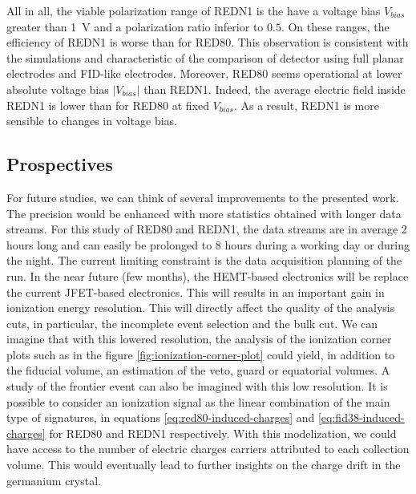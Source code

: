 All in all, the viable polarization range of REDN1 is the have a voltage bias $V_{bias}$ greater than \SI{1}{\volt} and a polarization ratio inferior to $0.5$. On these ranges, the efficiency of REDN1 is worse than for RED80. This observation is consistent with the simulations and characteristic of the comparison of detector using full planar electrodes and FID-like electrodes. Moreover, RED80 seems operational at lower absolute voltage bias $| V_{bias} |$ than REDN1. Indeed, the average electric field inside REDN1 is lower than for RED80 at fixed $V_{bias}$. As a result, REDN1 is more sensible to changes in voltage bias.


\subsection{Prospectives}

For future studies, we can think of several improvements to the presented work.
The precision would be enhanced with more statistics obtained with longer data streams. For this study of RED80 and REDN1, the data streams are in average 2 hours long and can easily be prolonged to 8 hours during a working day or during the night. The current limiting constraint is the data acquisition planning of the run.
In the near future (few months), the HEMT-based electronics will be replace the current JFET-based electronics. This will results in an important gain in ionization energy resolution. This will directly affect the quality of the analysis cuts, in particular, the incomplete event selection and the bulk cut.
We can imagine that with this lowered resolution, the analysis of the ionization corner plots such as in the figure \ref{fig:ionization-corner-plot} could yield, in addition to the fiducial volume, an estimation of the veto, guard or equatorial volumes.
A study of the frontier event can also be imagined with this low resolution. It is possible to consider an ionization signal as the linear combination of the main type of signatures, in equations \ref{eq:red80-induced-charges} and \ref{eq:fid38-induced-charges} for RED80 and REDN1 respectively. With this modelization, we could have access to the number of electric charges carriers attributed to each collection volume. This would eventually lead to further insights on the charge drift in the germanium crystal.
